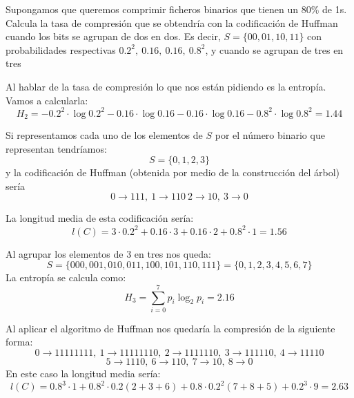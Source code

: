 \begin{problem}[13]
Supongamos que queremos comprimir ficheros binarios que tienen un 80\% de 1s. Calcula la tasa de compresión que se obtendría con la codificación de Huffman cuando los bits se agrupan de dos en dos. Es decir, $S=\{00,01,10,11\}$ con probabilidades respectivas $0.2^2, \ 0.16, \ 0.16, \ 0.8^2$, y cuando se agrupan de tres en tres
\solution

\yoP

Al hablar de la tasa de compresión lo que nos están pidiendo es la entropía. Vamos a calcularla:
\[H_2=-0.2^2 \cdot  \log 0.2^2-0.16\cdot \log 0.16 -0.16\cdot \log 0.16- 0.8^2\cdot \log 0.8^2 = 1.44\]

Si representamos cada uno de los elementos de $S$ por el número binario que representan tendríamos:
\[S=\{0,1,2,3\}\]
y la codificación de Huffman (obtenida por medio de la construcción del árbol) sería
\[0 \to 111, \  1\to 110 \ 2 \to 10, \ 3 \to  0\]

La longitud media de esta codificación sería:
\[l(C)=3\cdot 0.2^2+0.16\cdot 3+0.16\cdot 2+0.8^2\cdot 1 = 1.56\]

Al agrupar los elementos de 3 en tres nos queda:
\[S=\{000,001,010,011,100,101,110,111\} = \{0,1,2,3,4,5,6,7\}\]
La entropía se calcula como:
\[H_3=\sum_{i=0}^7 p_i\log_2 p_i =2.16\]

Al aplicar el algoritmo de Huffman nos quedaría la compresión de la siguiente forma:
\[0 \to 11111111, \ 1 \to 11111110, \ 2 \to 1111110, \ 3 \to 111110, \ 4\to 11110\]
\[5\to 1110, \ 6 \to 110, \ 7\to 10, \ 8 \to 0\]
En este caso la longitud media sería:
\[l(C)=0.8^3\cdot 1+0.8^2\cdot 0.2(2+3+6)+0.8\cdot 0.2^2(7+8+5)+0.2^3\cdot 9=2.63\]

\end{problem}

